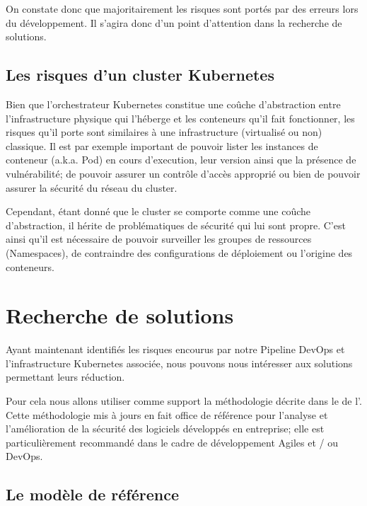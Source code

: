 On constate donc que majoritairement les risques sont portés par des erreurs lors du développement.
Il s'agira donc d'un point d'attention dans la recherche de solutions.

\subsection{Les risques d'un cluster Kubernetes}

Bien que l'orchestrateur Kubernetes constitue une coûche d'abstraction entre l'infrastructure physique qui 
l'héberge et les conteneurs qu'il fait fonctionner, les risques qu'il porte sont similaires à une infrastructure
(virtualisé ou non) classique. Il est par exemple important de pouvoir lister les instances de conteneur (a.k.a. 
Pod) en cours d'execution, leur version ainsi que la présence de vulnérabilité; de pouvoir assurer un contrôle
d'accès approprié ou bien de pouvoir assurer la sécurité du réseau du cluster. 

Cependant, étant donné que le cluster se comporte comme une coûche d'abstraction, il hérite de problématiques
de sécurité qui lui sont propre. C'est ainsi qu'il est nécessaire de pouvoir surveiller les groupes de ressources
(Namespaces), de contraindre des configurations de déploiement ou l'origine des conteneurs.

\newpage

\section{Recherche de solutions}

Ayant maintenant identifiés les risques encourus par notre Pipeline DevOps et l'infrastructure Kubernetes associée,
nous pouvons nous intéresser aux solutions permettant leurs réduction.

Pour cela nous allons utiliser comme support la méthodologie décrite dans le 
\autocite{samm_v2.0_owasp_project_2021}
de l'\citeauthor{samm_v2.0_owasp_project_2021}. Cette méthodologie mis à jours en 
fait office de référence pour l'analyse et l'amélioration de la sécurité des logiciels développés en entreprise; elle est
particulièrement recommandé dans le cadre de développement Agiles et / ou DevOps.

\subsection{Le modèle de référence}

